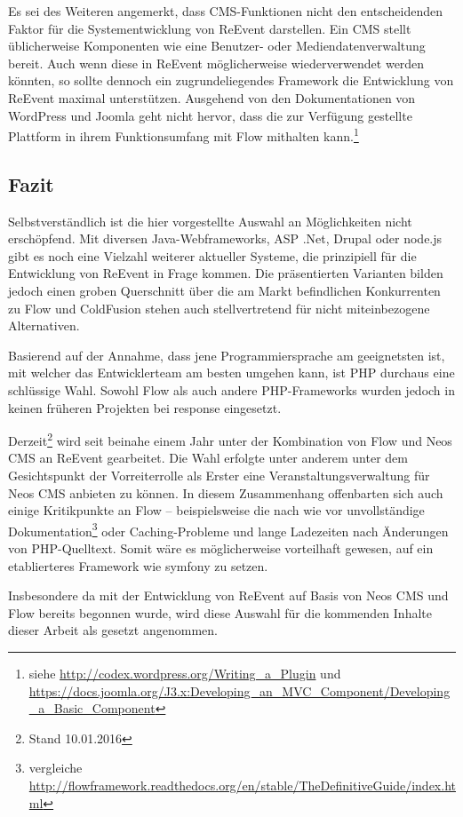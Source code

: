 Es sei des Weiteren angemerkt, dass CMS-Funktionen nicht den entscheidenden Faktor für die Systementwicklung von ReEvent darstellen. Ein CMS stellt üblicherweise Komponenten wie eine Benutzer- oder Mediendatenverwaltung bereit. Auch wenn diese in ReEvent möglicherweise wiederverwendet werden könnten, so sollte dennoch ein zugrundeliegendes Framework die Entwicklung von ReEvent maximal unterstützen. Ausgehend von den Dokumentationen von WordPress und Joomla geht nicht hervor, dass die zur Verfügung gestellte Plattform in ihrem Funktionsumfang mit Flow mithalten kann.\footnote{siehe \url{http://codex.wordpress.org/Writing\_a\_Plugin} und \url{https://docs.joomla.org/J3.x:Developing\_an\_MVC\_Component/Developing\_a\_Basic\_Component}}


\subsection{Fazit}
Selbstverständlich ist die hier vorgestellte Auswahl an Möglichkeiten nicht erschöpfend. Mit diversen Java-Webframeworks, ASP .Net, Drupal oder node.js gibt es noch eine Vielzahl weiterer aktueller Systeme, die prinzipiell für die Entwicklung von ReEvent in Frage kommen. Die präsentierten Varianten bilden jedoch einen groben Querschnitt über die am Markt befindlichen Konkurrenten zu Flow und ColdFusion stehen auch stellvertretend für nicht miteinbezogene Alternativen.

Basierend auf der Annahme, dass jene Programmiersprache am geeignetsten ist, mit welcher das Entwicklerteam am besten umgehen kann, ist PHP durchaus eine schlüssige Wahl. Sowohl Flow als auch andere PHP-Frameworks wurden jedoch in keinen früheren Projekten bei response eingesetzt.

Derzeit\footnote{Stand 10.01.2016} wird seit beinahe einem Jahr unter der Kombination von Flow und Neos CMS an ReEvent gearbeitet. Die Wahl erfolgte unter anderem unter dem Gesichtspunkt der Vorreiterrolle als Erster eine Veranstaltungsverwaltung für Neos CMS anbieten zu können. In diesem Zusammenhang offenbarten sich auch einige Kritikpunkte an Flow -- beispielsweise die nach wie vor unvollständige Dokumentation\footnote{vergleiche \url{http://flowframework.readthedocs.org/en/stable/TheDefinitiveGuide/index.html}} oder Caching-Probleme und lange Ladezeiten nach Änderungen von PHP-Quelltext. Somit wäre es möglicherweise vorteilhaft gewesen, auf ein etablierteres Framework wie symfony zu setzen.

Insbesondere da mit der Entwicklung von ReEvent auf Basis von Neos CMS und Flow bereits begonnen wurde, wird diese Auswahl für die kommenden Inhalte dieser Arbeit als gesetzt angenommen.

